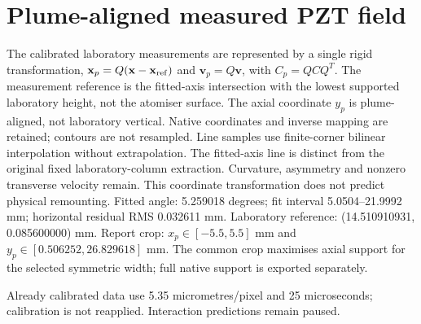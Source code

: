 \section{Plume-aligned measured PZT field}
The calibrated laboratory measurements are represented by a single rigid transformation,
$\mathbf{x}_p=Q(\mathbf{x}-\mathbf{x}_{\rm ref})$ and $\mathbf{v}_p=Q\mathbf{v}$,
with $C_p=QCQ^T$. The measurement reference is the fitted-axis intersection with
the lowest supported laboratory height, not the atomiser surface. The axial coordinate
$y_p$ is plume-aligned, not laboratory vertical. Native coordinates and inverse mapping
are retained; contours are not resampled. Line samples use finite-corner bilinear
interpolation without extrapolation. The fitted-axis line is distinct from the original
fixed laboratory-column extraction. Curvature, asymmetry and nonzero transverse velocity
remain. This coordinate transformation does not predict physical remounting.
Fitted angle: 5.259018 degrees; fit interval 5.0504--21.9992 mm; horizontal residual RMS 0.032611 mm.
Laboratory reference: (14.510910931, 0.085600000) mm. Report crop: $x_p\in[-5.5,5.5]$ mm and $y_p\in[0.506252,26.829618]$ mm. The common crop maximises axial support for the selected symmetric width; full native support is exported separately.

Already calibrated data use 5.35 micrometres/pixel and 25 microseconds; calibration is not reapplied. Interaction predictions remain paused.
